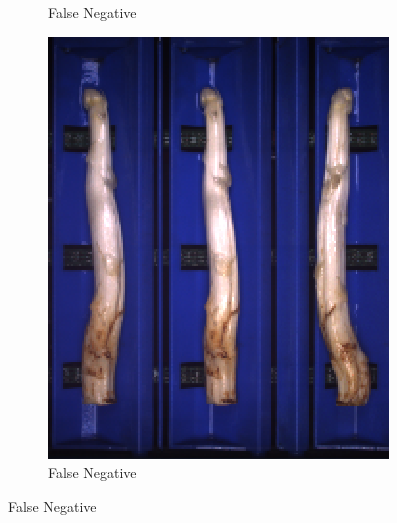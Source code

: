 \begin{figure}[h]
\begin{subfigure}{0.3\textwidth}
		\vspace{-5pt}
		\caption{False Negative}
	\end{subfigure}
	\begin{subfigure}{0.3\textwidth}
		\includegraphics[width=0.9\linewidth]{Figures/appendix/medium_falsenegative_03.png}
		\vspace{-5pt}
		\caption{False Negative}
	\end{subfigure}


\end{figure}
